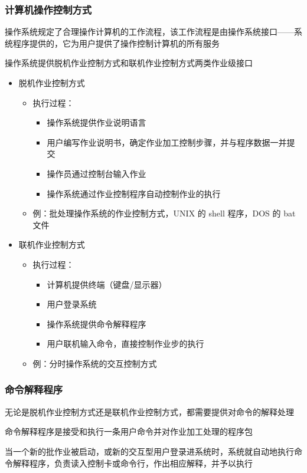 \documentclass[cs4size,a4paper,10pt]{ctexart}
\begin{document}
		\subsubsection{计算机操作控制方式}
		操作系统规定了合理操作计算机的工作流程，该工作流程是由操作系统接口——系统程序提供的，它为用户提供了操作控制计算机的所有服务

		操作系统提供脱机作业控制方式和联机作业控制方式两类作业级接口
		\begin{itemize}
			\item 脱机作业控制方式
			\begin{itemize}
				\item 执行过程：
				\begin{itemize}
					\item 操作系统提供作业说明语言
					\item 用户编写作业说明书，确定作业加工控制步骤，并与程序数据一并提交
					\item 操作员通过控制台输入作业
					\item 操作系统通过作业控制程序自动控制作业的执行
				\end{itemize}
				\item 例：批处理操作系统的作业控制方式，UNIX 的 shell 程序，DOS 的 bat文件
			\end{itemize}
			\item 联机作业控制方式
			\begin{itemize}
				\item 执行过程：
				\begin{itemize}
					\item 计算机提供终端（键盘/显示器）
					\item 用户登录系统
					\item 操作系统提供命令解释程序
					\item 用户联机输入命令，直接控制作业步的执行
				\end{itemize}
				\item 例：分时操作系统的交互控制方式
			\end{itemize}
		\end{itemize}


		\subsubsection{命令解释程序}
		无论是脱机作业控制方式还是联机作业控制方式，都需要提供对命令的解释处理

		命令解释程序是接受和执行一条用户命令并对作业加工处理的程序包

		当一个新的批作业被启动，或新的交互型用户登录进系统时，系统就自动地执行命令解释程序，负责读入控制卡或命令行，作出相应解释，并予以执行
\end{document}
